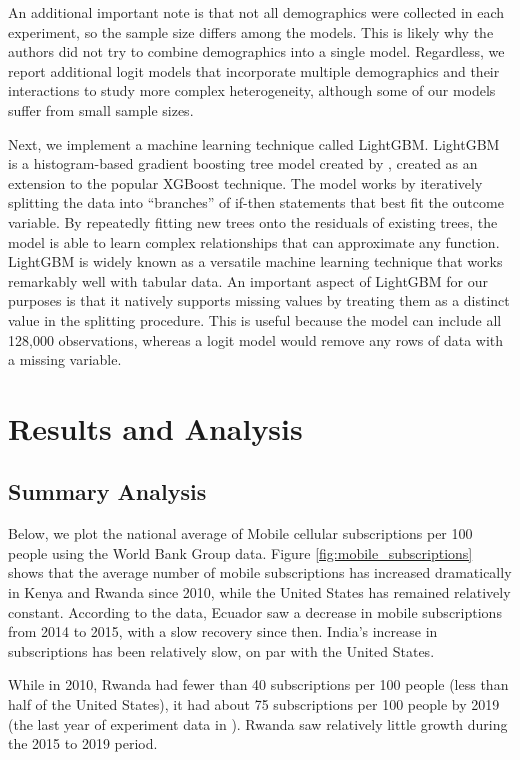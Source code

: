 \documentclass[12pt]{article}
\begin{document}
An additional important note is that not all demographics were collected in each experiment, so the sample size differs among the models. This is likely why the authors did not try to combine demographics into a single model. Regardless, we report additional logit models that incorporate multiple demographics and their interactions to study more complex heterogeneity, although some of our models suffer from small sample sizes.

Next, we implement a machine learning technique called LightGBM. LightGBM is a histogram-based gradient boosting tree model created by \textcite{ke_lightgbm_2017}, created as an extension to the popular XGBoost technique. The model works by iteratively splitting the data into ``branches'' of if-then statements that best fit the outcome variable. By repeatedly fitting new trees onto the residuals of existing trees, the model is able to learn complex relationships that can approximate any function. LightGBM is widely known as a versatile machine learning technique that works remarkably well with tabular data. An important aspect of LightGBM for our purposes is that it natively supports missing values by treating them as a distinct value in the splitting procedure. This is useful because the model can include all 128,000 observations, whereas a logit model would remove any rows of data with a missing variable.

\section{Results and Analysis}
\label{section:results}
\subsection{Summary Analysis}
Below, we plot the national average of Mobile cellular subscriptions per 100 people using the World Bank Group data. Figure \ref{fig:mobile_subscriptions} shows that the average number of mobile subscriptions has increased dramatically in Kenya and Rwanda since 2010, while the United States has remained relatively constant. According to the data, Ecuador saw a decrease in mobile subscriptions from 2014 to 2015, with a slow recovery since then. India's increase in subscriptions has been relatively slow, on par with the United States. 

While in 2010, Rwanda had fewer than 40 subscriptions per 100 people (less than half of the United States), it had about 75 subscriptions per 100 people by 2019 (the last year of experiment data in \textcite{fabregas_digital_2025}). Rwanda saw relatively little growth during the 2015 to 2019 period.
\end{document}
